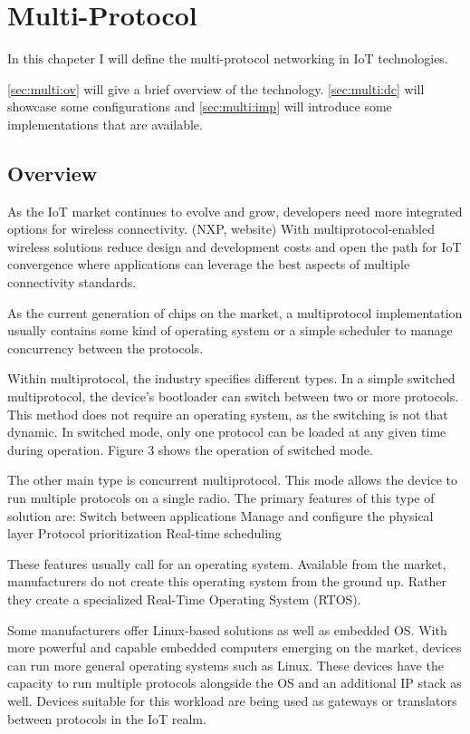 \chapter{Multi-Protocol}
\label{chap:multiprot}
In this chapeter I will define the multi-protocol networking in IoT technologies.

\autoref{sec:multi:ov} will give a brief overview of the technology.
\autoref{sec:multi:dc} will showcase some configurations and \autoref{sec:multi:imp} will introduce some implementations that are available.

\section{Overview}
\label{sec:multi:ov}
As the IoT market continues to evolve and grow, developers need more integrated options for wireless connectivity. (NXP, website) With multiprotocol-enabled wireless solutions reduce design and development costs and open the path for IoT convergence where applications can leverage the best aspects of multiple connectivity standards.

As the current generation of chips on the market, a multiprotocol implementation usually contains some kind of operating system or a simple scheduler to manage concurrency between the protocols.

Within multiprotocol, the industry specifies different types. In a simple switched multiprotocol, the device's bootloader can switch between two or more protocols. This method does not require an operating system, as the switching is not that dynamic. In switched mode, only one protocol can be loaded at any given time during operation. Figure 3 shows the operation of switched mode.

The other main type is concurrent multiprotocol. This mode allows the device to run multiple protocols on a single radio. The primary features of this type of solution are:
Switch between applications
Manage and configure the physical layer
Protocol prioritization
Real-time scheduling

These features usually call for an operating system. Available from the market, manufacturers do not create this operating system from the ground up. Rather they create a specialized Real-Time Operating System (RTOS).

Some manufacturers offer Linux-based solutions as well as embedded OS. With more powerful and capable embedded computers emerging on the market, devices can run more general operating systems such as Linux. These devices have the capacity to run multiple protocols alongside the OS and an additional IP stack as well. Devices suitable for this workload are being used as gateways or translators between protocols in the IoT realm.

